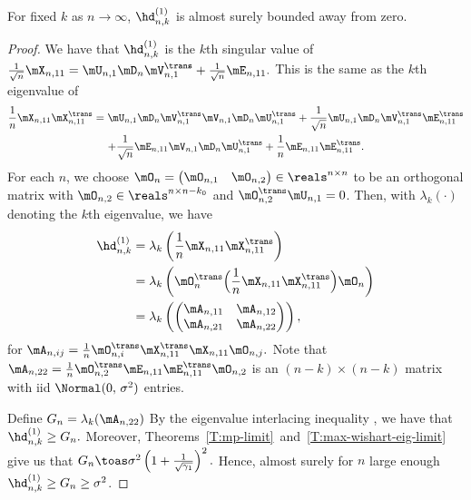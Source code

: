 \begin{lemma}\label{L:d1-bounded-away-from-0}
	For fixed $k$ as $n \to \infty$, 
	$\hd_{n,k}^{(1)} $ is almost surely bounded away from zero.
\end{lemma}
\begin{proof}
	We have that $\hd_{n,k}^{(1)}$ is the $k$th singular value of
	\(
		\frac{1}{\sqrt{n}} \mX_{n,11}
			=
				\mU_{n,1} \mD_n \mV_{n,1}^\trans
				+
				\frac{1}{\sqrt{n}}
				\mE_{n,11}.
	\)
	This is the same as the $k$th eigenvalue of
	\begin{multline*}
		\frac{1}{n} \mX_{n,11} \mX_{n,11}^\trans
			=
				\mU_{n,1} \mD_n \mV_{n,1}^\trans 
					\mV_{n,1} \mD_n \mU_{n,1}^\trans
				+
				\frac{1}{\sqrt{n}}
				\mU_{n,1} \mD_n \mV_{n,1}^\trans \mE_{n,11}^\trans \\
				+
				\frac{1}{\sqrt{n}}
				\mE_{n,11}
				\mV_{n,1} \mD_n \mU_{n,1}^\trans
				+
				\frac{1}{n}
				\mE_{n,11} \mE_{n,11}^\trans.
	\end{multline*}
	For each $n$, we choose 
	\(
		\mO_n
			=
			\left(
			\begin{matrix}
				\mO_{n,1} & \mO_{n,2}
			\end{matrix}
			\right)
		\in \reals^{n \times n}
	\)
	to be an orthogonal matrix with $\mO_{n,2} \in \reals^{n \times n-k_0}$ 
	and $\mO_{n,2}^\trans \mU_{n,1} = 0$.
	Then, with $\lambda_k(\cdot)$ denoting the $k$th eigenvalue, we have
	\begin{align*}
		\hd_{n,k}^{(1)}
			&=
				\lambda_k \left(
					\frac{1}{n} \mX_{n,11} \mX_{n,11}^\trans
				\right) \\
			&=
				\lambda_k \left(
					\mO_{n}^\trans
					\Big(
						\frac{1}{n} \mX_{n,11} \mX_{n,11}^\trans
					\Big)
					\mO_n
				\right) \\
			&=
				\lambda_k \left(
					\left(
					\begin{matrix}
						\mA_{n,11} & \mA_{n,12} \\
						\mA_{n,21} & \mA_{n,22}
					\end{matrix}
					\right)
				\right),
	\end{align*}
	for
	\(
		\mA_{n,ij} 
			= 
				\frac{1}{n}
				\mO_{n,i}^\trans 
				\mX_{n,11}^\trans \mX_{n,11}
				\mO_{n,j}.
	\)
	Note that
	\(
		\mA_{n,22} 
			= 
				\frac{1}{n} 
				\mO_{n,2}^\trans \mE_{n,11} \mE_{n,11}^\trans \mO_{n,2}
	\)
	is an $(n-k) \times (n-k)$ matrix with iid $\Normal( 0, \, \sigma^2)$
	entries.
	
	Define $G_n = \lambda_k ( \mA_{n,22} )$
	By the eigenvalue interlacing inequality \cite{golub1996mc}, we have
	that
	\(
		\hd_{n,k}^{(1)}
			\geq
				G_n.
	\)
	Moreover, Theorems~\ref{T:mp-limit}~and~\ref{T:max-wishart-eig-limit}
	give us that 
	\(
		G_n
			\toas 
				\sigma^2
				\left(
					1 + \frac{1}{\sqrt{\gamma_1}}
				\right)^2.
	\)
	Hence, almost surely for $n$ large enough 
	$\hd_{n,k}^{(1)} \geq G_n \geq \sigma^2$.
\end{proof}

